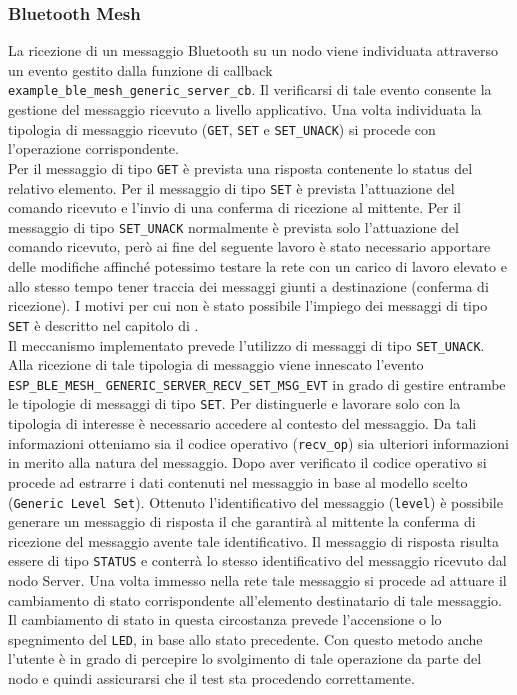 \subsubsection{Bluetooth Mesh}
La ricezione di un messaggio Bluetooth su un nodo viene individuata attraverso un evento gestito dalla funzione di callback \texttt{example\_ble\_mesh\_generic\_server\_cb}. Il verificarsi di tale evento consente la gestione del messaggio ricevuto a livello applicativo. Una volta individuata la tipologia di messaggio ricevuto (\texttt{GET}, \texttt{SET} e \texttt{SET\_UNACK}) si procede con l'operazione corrispondente.\\
Per il messaggio di tipo \texttt{GET} è prevista una risposta contenente lo status del relativo elemento.
Per il messaggio di tipo \texttt{SET} è prevista l'attuazione del comando ricevuto e l'invio di una conferma di ricezione al mittente.
Per il messaggio di tipo \texttt{SET\_UNACK} normalmente è prevista solo l'attuazione del comando ricevuto, però ai fine del seguente lavoro è stato necessario apportare delle modifiche affinché potessimo testare la rete con un carico di lavoro elevato e allo stesso tempo tener traccia dei messaggi giunti a destinazione (conferma di ricezione). I motivi per cui non è stato possibile l'impiego dei messaggi di tipo \texttt{SET} è descritto nel capitolo di .\\

\noindent Il meccanismo implementato prevede l'utilizzo di messaggi di tipo \texttt{SET\_UNACK}. Alla ricezione di tale tipologia di messaggio viene innescato l'evento \texttt{ESP\_BLE\_MESH\_} \texttt{GENERIC\_SERVER\_RECV\_SET\_MSG\_EVT} in grado di gestire entrambe le tipologie di messaggi di tipo \texttt{SET}. Per distinguerle e lavorare solo con la tipologia di interesse è necessario accedere al contesto del messaggio. Da tali informazioni otteniamo sia il codice operativo (\texttt{recv\_op}) sia ulteriori informazioni in merito alla natura del messaggio. Dopo aver verificato il codice operativo si procede ad estrarre i dati contenuti nel messaggio in base al modello scelto (\texttt{Generic Level Set}). Ottenuto l'identificativo del messaggio (\texttt{level}) è possibile generare un messaggio di risposta il che garantirà al mittente la conferma di ricezione del messaggio avente tale identificativo. Il messaggio di risposta risulta essere di tipo \texttt{STATUS} e conterrà lo stesso identificativo del messaggio ricevuto dal nodo Server. Una volta immesso nella rete tale messaggio si procede ad attuare il cambiamento di stato corrispondente all'elemento destinatario di tale messaggio. Il cambiamento di stato in questa circostanza prevede l'accensione o lo spegnimento del \texttt{LED}, in base allo stato precedente. Con questo metodo anche l'utente è in grado di percepire lo svolgimento di tale operazione da parte del nodo e quindi assicurarsi che il test sta procedendo correttamente.\\


